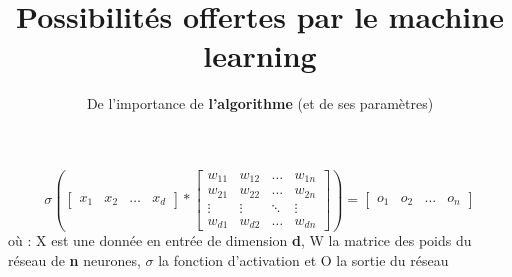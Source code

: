 \documentclass{formation}
\title{Possibilités offertes par le machine learning}
\subtitle{De l'importance de \textbf{l'algorithme} (et de ses paramètres)}
\begin{document}
\maketitle


\begin{frame}
  \[
  \sigma \left(
  \begin{bmatrix}
    x_{1} & x_{2} & \dots & x_{d}
  \end{bmatrix}
  *
  \begin{bmatrix}
    w_{11} & w_{12} & \dots  & w_{1n} \\
    w_{21} & w_{22} & \dots  & w_{2n} \\
    \vdots & \vdots & \ddots & \vdots \\
    w_{d1} & w_{d2} & \dots  & w_{dn}
  \end{bmatrix}
  \right )
  =
  \begin{bmatrix}
    o_{1} & o_{2} & \dots & o_{n}
  \end{bmatrix}
  \]
  \newline
  où :
  \newline
  X est une donnée en entrée de dimension \textbf{d},
  \newline
  W la matrice des poids du réseau de  \textbf{n} neurones,
  \newline
  $\sigma$ la fonction d'activation et
  \newline
  O la sortie du réseau
\end{frame}

\begin{frame}
\end{frame}
\end{document}

